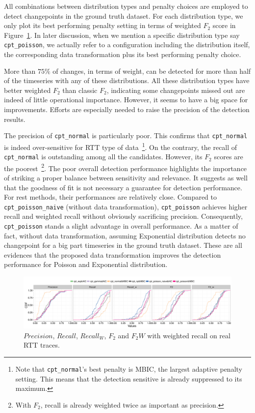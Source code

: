 All combinations between distribution types and penalty choices are employed to detect changepoints in the ground truth dataset.
For each distribution type, we only plot its best performing penalty setting in terms of weighted $F_2$ score in Figure~\ref{fig:real_eval}.
In later discussion, when we mention a specific distribution type say \texttt{cpt\_poisson}, we actually refer to a configuration including the distribution itself, the corresponding data transformation plus its best performing penalty choice.

More than $75\%$ of changes, in terms of weight, can be detected for more than half of the timeseries with any of these distributions.
All these distribution types have better weighted $F_2$ than classic $F_2$, indicating some changepoints missed out are indeed of little operational importance.
However, it seems to have a big space for improvements.
Efforts are especially needed to raise the precision of the detection results.

The precision of \texttt{cpt\_normal} is particularly poor.
This confirms that \texttt{cpt\_normal} is indeed over-sensitive for RTT type of data~\footnote{Note that \texttt{cpt\_normal}'s best penalty is MBIC, the largest adaptive penalty setting. This means that the detection sensitive is already suppressed to its maximum.}.
On the contrary, the recall of \texttt{cpt\_normal} is outstanding among all the candidates.
However, its $F_2$ scores are the poorest~\footnote{With $F_2$, recall is already weighted twice as important as precision.}.
The poor overall detection performance highlights the importance of striking a proper balance between sensitivity and relevance.
It suggests as well that the goodness of fit is not necessary a guarantee for detection performance.
For rest methods, their performances are relatively close. 
Compared to \texttt{cpt\_poisson\_naive} (without data transformation), \texttt{cpt\_poisson} achieves higher recall and weighted recall without obviously sacrificing precision.
Consequently, \texttt{cpt\_poisson} stands a slight advantage in overall performance.
As a matter of fact, without data transformation, assuming Exponential distribution detects no changepoint for a big part timeseries in the ground truth dataset.
These are all evidences that the proposed data transformation improves the detection performance for Poisson and Exponential distribution.

\begin{landscape}
\begin{figure}[!ht]
\centering
\includegraphics[width=1.8\textwidth]{gfx/chap4/real_eval_bis.pdf}
\caption{$Precision$, $Recall$, $Recall_W$, $F_2$ and $F_2W$ with weighted recall on real RTT traces.}
\label{fig:real_eval}
\end{figure}
\end{landscape}

